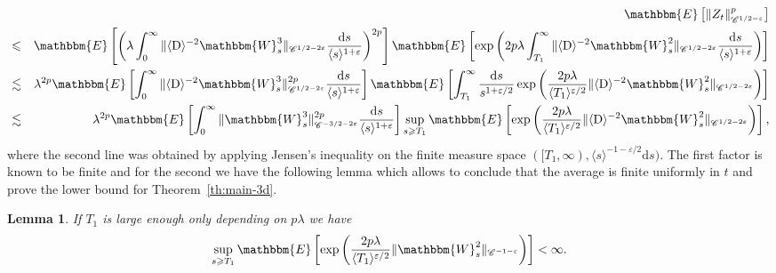 \documentclass[11pt, oneside]{article}   	%
\newcommand{\mathD}{\mathrm{D}}
\newcommand{\mathd}{\mathrm{d}}
\newtheorem{lemma}{Lemma}
\newcommand{\VV}{\mathscr{C}}
\begin{document}
\begin{eqnarray*}
  &  & \mathbbm{E} \left[ \| Z_t \|^p_{\VV^{1 / 2 - \varepsilon}} \right]\\
  & \leqslant & \mathbbm{E} \left[ \left( \lambda \int_0^{\infty} \| \langle
  \mathD \rangle^{- 2} \mathbbm{W}_s^3 \|_{\VV^{1 / 2 - 2 \varepsilon}}
  \frac{\mathd s}{\langle s \rangle^{1 + \varepsilon}} \right)^{2 p} \right]
  \mathbbm{E} \left[ \exp \left( 2 p \lambda \int^{\infty}_{T_1} \| \langle
  \mathD \rangle^{- 2} \mathbbm{W}^2_s \|_{\VV^{1 / 2 - 2 \varepsilon}}
  \frac{\mathd s}{\langle s \rangle^{1 + \varepsilon}} \right) \right]\\
  & \lesssim & \lambda^{2 p} \mathbbm{E} \left[ \int_0^{\infty} \| \langle
  \mathD \rangle^{- 2} \mathbbm{W}_s^3 \|^{2 p}_{\VV^{1 / 2 - 2 \varepsilon}}
  \frac{\mathd s}{\langle s \rangle^{1 + \varepsilon}} \right] \mathbbm{E}
  \left[ \int^{\infty}_{T_1} \frac{\mathd s}{s^{1 + \varepsilon / 2}} \exp
  \left( \frac{2 p \lambda}{\langle T_1 \rangle^{\varepsilon / 2}} \| \langle
  \mathD \rangle^{- 2} \mathbbm{W}^2_s \|_{\VV^{1 / 2 - 2 \varepsilon}}
  \right) \right]\\
  & \lesssim & \lambda^{2 p} \mathbbm{E} \left[ \int_0^{\infty} \|
  \mathbbm{W}_s^3 \|^{2 p}_{\VV^{- 3 / 2 - 2 \varepsilon}} \frac{\mathd
  s}{\langle s \rangle^{1 + \varepsilon}} \right] \sup_{s \geqslant T_1}
  \mathbbm{E} \left[ \exp \left( \frac{2 p \lambda}{\langle T_1
  \rangle^{\varepsilon / 2}} \| \langle \mathD \rangle^{- 2} \mathbbm{W}^2_s
  \|_{\VV^{1 / 2 - 2 \varepsilon}} \right) \right],
\end{eqnarray*}
where the second line was obtained by applying Jensen's inequality on the
finite measure space $([T_1, \infty), \langle s \rangle^{- 1 - \varepsilon /
2} \mathd s)$. The first factor is known to be finite and for the second we
have the following lemma which allows to conclude that the average is finite
uniformly in $t$ and prove the lower bound for Theorem~\ref{th:main-3d}.

\begin{lemma}
  If $T_1$ is large enough only depending on $p \lambda$ we have
  \[ \sup_{s \geqslant T_1} \mathbbm{E} \left[ \exp \left( \frac{2 p
     \lambda}{\langle T_1 \rangle^{\varepsilon / 2}} \| \mathbbm{W}^2_s
     \|_{\VV^{- 1 - \varepsilon}} \right) \right] < \infty . \]
\end{lemma}
\end{document}
